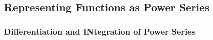 \subsection{Representing Functions as Power Series}

\subsubsection*{Differentiation and INtegration of Power Series}
